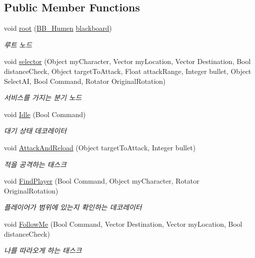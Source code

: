 \subsection*{Public Member Functions}
\begin{DoxyCompactItemize}
\item 
void \hyperlink{class_b_t___base_a54881cf55e411fdbf6c9f98586049742}{root} (\hyperlink{class_b_b___humen}{B\+B\+\_\+\+Humen} \hyperlink{class_b_t___base_a8a095b67df2778f5155d24dad9f818ef}{blackboard})
\begin{DoxyCompactList}\small\item\em 루트 노드 \end{DoxyCompactList}\item 
void \hyperlink{class_b_t___base_adbbf3731340b4e525a1ea549fd6409f3}{selector} (Object my\+Character, Vector my\+Location, Vector Destination, Bool distance\+Check, Object target\+To\+Attack, Float attack\+Range, Integer bullet, Object Select\+AI, Bool Command, Rotator Original\+Rotation)
\begin{DoxyCompactList}\small\item\em 서비스를 가지는 분기 노드 \end{DoxyCompactList}\item 
void \hyperlink{class_b_t___base_a68cb1b35bc3105c36e0bd4b8477a1ec9}{Idle} (Bool Command)
\begin{DoxyCompactList}\small\item\em 대기 상태 데코레이터 \end{DoxyCompactList}\item 
void \hyperlink{class_b_t___base_a4473d81f72741d7b1b4956feada36a28}{Attack\+And\+Reload} (Object target\+To\+Attack, Integer bullet)
\begin{DoxyCompactList}\small\item\em 적을 공격하는 태스크 \end{DoxyCompactList}\item 
void \hyperlink{class_b_t___base_a185c89f6b41c5946e6dac9489f251c0f}{Find\+Player} (Bool Command, Object my\+Character, Rotator Original\+Rotation)
\begin{DoxyCompactList}\small\item\em 플레이어가 범위에 있는지 확인하는 데코레이터 \end{DoxyCompactList}\item 
void \hyperlink{class_b_t___base_a802b9e457808b511a6bc5ea63abd3b87}{Follow\+Me} (Bool Command, Vector Destination, Vector my\+Location, Bool distance\+Check)
\begin{DoxyCompactList}\small\item\em 나를 따라오게 하는 태스크 \end{DoxyCompactList}\item 

\end{DoxyCompactItemize}
